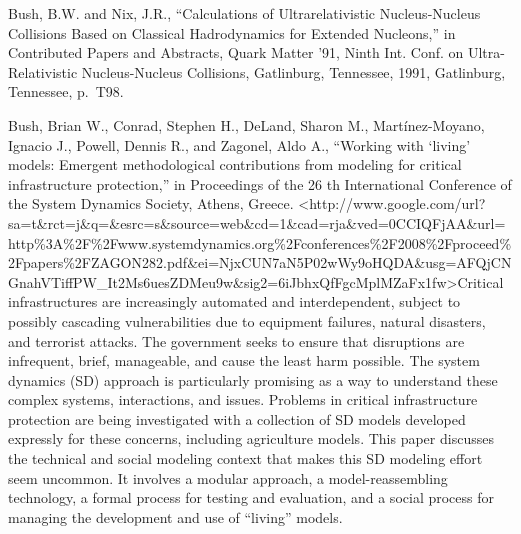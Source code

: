 \documentclass[]{article}
\begin{document}
Bush, B.W. and Nix, J.R., ``Calculations of Ultrarelativistic
Nucleus-Nucleus Collisions Based on Classical Hadrodynamics for Extended
Nucleons,'' in Contributed Papers and Abstracts, Quark Matter '91, Ninth
Int. Conf. on Ultra-Relativistic Nucleus-Nucleus Collisions, Gatlinburg,
Tennessee, 1991, Gatlinburg, Tennessee, p.~T98.

Bush, Brian W., Conrad, Stephen H., DeLand, Sharon M., Martínez-Moyano,
Ignacio J., Powell, Dennis R., and Zagonel, Aldo A., ``Working with
`living' models: Emergent methodological contributions from modeling for
critical infrastructure protection,'' in Proceedings of the 26 th
International Conference of the System Dynamics Society, Athens, Greece.
\textless{}http://www.google.com/url?sa=t\&rct=j\&q=\&esrc=s\&source=web\&cd=1\&cad=rja\&ved=0CCIQFjAA\&url=http\%3A\%2F\%2Fwww.systemdynamics.org\%2Fconferences\%2F2008\%2Fproceed\%2Fpapers\%2FZAGON282.pdf\&ei=NjxCUN7aN5P02wWy9oHQDA\&usg=AFQjCNGnahVTiffPW\_It2Ms6uesZDMeu9w\&sig2=6iJbhxQfFgcMplMZaFx1fw\textgreater{}Critical
infrastructures are increasingly automated and interdependent, subject
to possibly cascading vulnerabilities due to equipment failures, natural
disasters, and terrorist attacks. The government seeks to ensure that
disruptions are infrequent, brief, manageable, and cause the least harm
possible. The system dynamics (SD) approach is particularly promising as
a way to understand these complex systems, interactions, and issues.
Problems in critical infrastructure protection are being investigated
with a collection of SD models developed expressly for these concerns,
including agriculture models. This paper discusses the technical and
social modeling context that makes this SD modeling effort seem
uncommon. It involves a modular approach, a model-reassembling
technology, a formal process for testing and evaluation, and a social
process for managing the development and use of ``living'' models.
\end{document}
